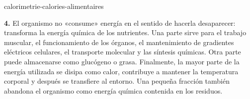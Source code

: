 \begin{exo}{calorimetrie-calories-alimentaires}
\begin{solution}
\textbf{4.} El organismo no «consume» energía en el sentido de hacerla desaparecer: transforma la energía química de los nutrientes. Una parte sirve para el trabajo muscular, el funcionamiento de los órganos, el mantenimiento de gradientes eléctricos celulares, el transporte molecular y las síntesis químicas. Otra parte puede almacenarse como glucógeno o grasa. Finalmente, la mayor parte de la energía utilizada se disipa como calor, contribuye a mantener la temperatura corporal y después se transfiere al entorno. Una pequeña fracción también abandona el organismo como energía química contenida en los residuos.
\end{solution}
\end{exo}

